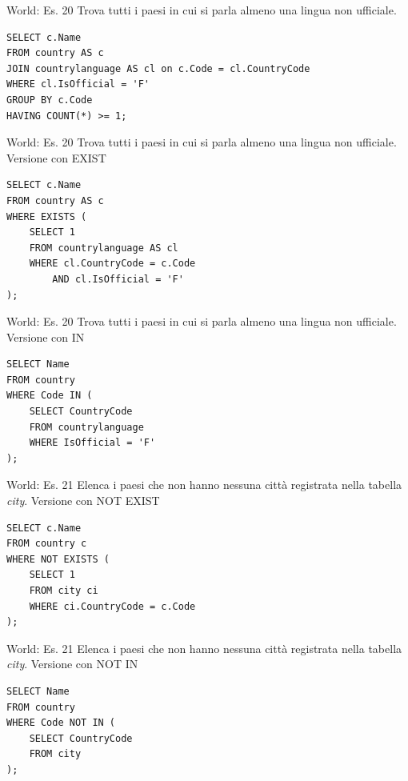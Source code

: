 \begin{frame}[fragile]{World: Es. 20}
Trova tutti i paesi in cui si parla almeno una lingua non ufficiale.
\pause
\begin{lstlisting}
SELECT c.Name
FROM country AS c
JOIN countrylanguage AS cl on c.Code = cl.CountryCode
WHERE cl.IsOfficial = 'F'
GROUP BY c.Code
HAVING COUNT(*) >= 1;
\end{lstlisting}
\end{frame}

\begin{frame}[fragile]{World: Es. 20}
Trova tutti i paesi in cui si parla almeno una lingua non ufficiale.
\newline
\newline
Versione con EXIST
\begin{lstlisting}
SELECT c.Name
FROM country AS c
WHERE EXISTS (
    SELECT 1
    FROM countrylanguage AS cl
    WHERE cl.CountryCode = c.Code
        AND cl.IsOfficial = 'F'
);
\end{lstlisting}
\end{frame}

\begin{frame}[fragile]{World: Es. 20}
Trova tutti i paesi in cui si parla almeno una lingua non ufficiale.
\newline
\newline
Versione con IN
\begin{lstlisting}
SELECT Name
FROM country
WHERE Code IN (
    SELECT CountryCode
    FROM countrylanguage
    WHERE IsOfficial = 'F'
);
\end{lstlisting}
\end{frame}
%


\begin{frame}[fragile]{World: Es. 21}
Elenca i paesi che non hanno nessuna citt\`a registrata nella tabella \textit{city}.
\pause
\newline
\newline
Versione con NOT EXIST
\begin{lstlisting}
SELECT c.Name
FROM country c
WHERE NOT EXISTS (
    SELECT 1
    FROM city ci
    WHERE ci.CountryCode = c.Code
);
\end{lstlisting}
\end{frame}

\begin{frame}[fragile]{World: Es. 21}
Elenca i paesi che non hanno nessuna citt\`a registrata nella tabella \textit{city}.
\newline
\newline
Versione con NOT IN
\begin{lstlisting}
SELECT Name
FROM country
WHERE Code NOT IN (
    SELECT CountryCode
    FROM city
);
\end{lstlisting}
\end{frame}

